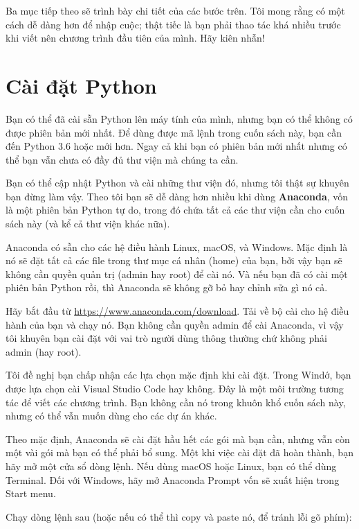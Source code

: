 \documentclass[12pt, openany]{book}
\theoremstyle{exercise}
\begin{document}
Ba mục tiếp theo sẽ trình bày chi tiết của các bước trên. Tôi mong rằng có một cách dễ dàng hơn để nhập cuộc; thật tiếc là bạn phải thao tác khá nhiều trước khi viết nên chương trình đầu tiên của mình. Hãy kiên nhẫn!


\section{Cài đặt Python}

Bạn có thể đã cài sẵn Python lên máy tính của mình, nhưng bạn có thể không có được phiên bản mới nhất. Để dùng được mã lệnh trong cuốn sách này, bạn cần đến Python 3.6 hoặc mới hơn. Ngay cả khi bạn có phiên bản mới nhất nhưng có thể bạn vẫn chưa có đầy đủ thư viện mà chúng ta cần.


Bạn có thể cập nhật Python và cài những thư viện đó, nhưng tôi thật sự khuyên bạn đừng làm vậy. Theo tôi bạn sẽ dễ dàng hơn nhiều khi dùng {\bf Anaconda}, vốn là một phiên bản Python tự do, trong đó chứa tất cả các thư viện cần cho cuốn sách này (và kể cả thư viện khác nữa).


Anaconda có sẵn cho các hệ điều hành Linux, macOS, và Windows.  Mặc định là nó sẽ đặt tất cả các file trong thư mục cá nhân (home) của bạn, bởi vậy bạn sẽ không cần quyền quản trị (admin hay root) để cài nó. Và nếu bạn đã có cài một phiên bản Python rồi, thì Anaconda sẽ không gỡ bỏ hay chỉnh sửa gì nó cả.

Hãy bắt đầu từ \url{https://www.anaconda.com/download}.  Tải về bộ cài cho hệ điều hành của bạn và chạy nó. Bạn không cần quyền admin để cài Anaconda, vì vậy tôi khuyên bạn cài đặt với vai trò người dùng thông thường chứ không phải admin (hay root).

Tôi đề nghị bạn chấp nhận các lựa chọn mặc định khi cài đặt. Trong Windớ, bạn được lựa chọn cài Visual Studio Code hay không. Đây là một môi trường tương tác để viết các chương trình. Bạn không cần nó trong khuôn khổ cuốn sách này, nhưng có thể vẫn muốn dùng cho các dự án khác. 

Theo mặc định, Anaconda sẽ cài đặt hầu hết các gói mà bạn cần, nhưng vẫn còn một vài gói mà bạn có thể phải bổ sung. Một khi việc cài đặt đã hoàn thành, bạn hãy mở một cửa sổ dòng lệnh. Nếu dùng macOS hoặc Linux, bạn có thể dùng Terminal.  Đối với Windows, hãy mở Anaconda Prompt vốn sẽ xuất hiện trong Start menu.

Chạy dòng lệnh sau (hoặc nếu có thể thì copy và paste nó, để tránh lỗi gõ phím):
\end{document}
